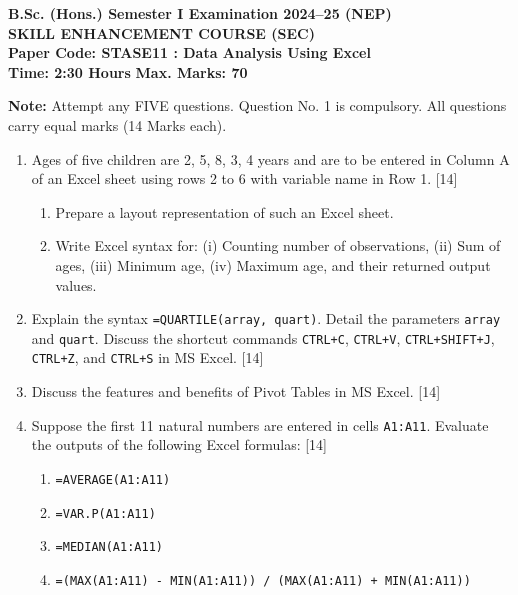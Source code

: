 \documentclass[11pt,a4paper]{article}
\begin{document}
\begin{center}
    {\Large   \textbf{B.Sc. (Hons.) Semester I Examination 2024--25 (NEP)}}\\[4pt]
    {\large   \textbf{SKILL ENHANCEMENT COURSE (SEC)}}\\[4pt]
   \textbf{Paper Code: STASE11 : Data Analysis Using Excel}\\[6pt]
   \textbf{Time: 2:30 Hours} \hfill   \textbf{Max. Marks: 70}
\end{center}
\hr




\noindent   \textbf{Note:} Attempt any FIVE questions. Question No. 1 is compulsory. All questions carry equal marks (14 Marks each).


\begin{enumerate}[label=   \textbf{\arabic*.}]
    \item Ages of five children are 2, 5, 8, 3, 4 years and are to be entered in Column A of an Excel sheet using rows 2 to 6 with variable name in Row 1. \hfill [14]
    
\begin{enumerate}[label=(\alph*)]
        \item Prepare a layout representation of such an Excel sheet.
        \item Write Excel syntax for: (i) Counting number of observations, (ii) Sum of ages, (iii) Minimum age, (iv) Maximum age, and their returned output values.
    \end{enumerate}

    \item Explain the syntax   \texttt{=QUARTILE(array, quart)}. Detail the parameters   \texttt{array} and   \texttt{quart}. Discuss the shortcut commands   \texttt{CTRL+C},   \texttt{CTRL+V},   \texttt{CTRL+SHIFT+J},   \texttt{CTRL+Z}, and   \texttt{CTRL+S} in MS Excel. \hfill [14]

    \item Discuss the features and benefits of Pivot Tables in MS Excel. \hfill [14]

    \item Suppose the first 11 natural numbers are entered in cells   \texttt{A1:A11}. Evaluate the outputs of the following Excel formulas: \hfill [14]
    
\begin{enumerate}[label=(\roman*)]
        \item   \texttt{=AVERAGE(A1:A11)}
        \item   \texttt{=VAR.P(A1:A11)}
        \item   \texttt{=MEDIAN(A1:A11)}
        \item   \texttt{=(MAX(A1:A11) - MIN(A1:A11)) / (MAX(A1:A11) + MIN(A1:A11))}
    \end{enumerate}


\end{enumerate}
\end{document}
